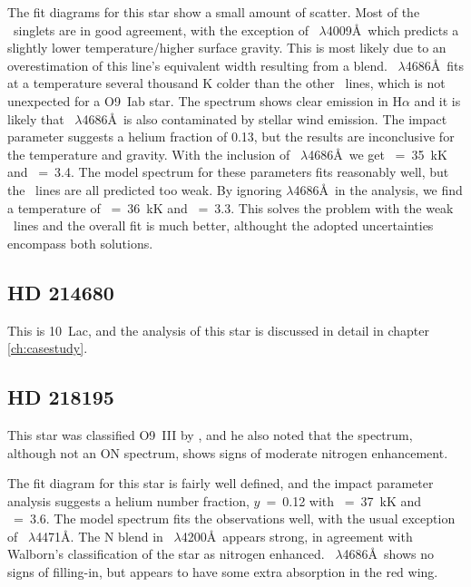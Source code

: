 The fit diagrams for this star show a small amount of scatter. Most of
the \hei\ singlets are in good agreement, with the exception of
\hei~$\lambda$4009\AA\ which predicts a slightly lower
temperature/higher surface gravity. This is most likely due to an
overestimation of this line's equivalent width resulting from a
blend. \heii~$\lambda$4686\AA\ fits at a temperature several thousand
K colder than the other \heii\ lines, which is not unexpected for a
O9~Iab star. The spectrum shows clear emission in H$\alpha$ and it is
likely that \heii~$\lambda$4686\AA\ is also contaminated by stellar
wind emission. The impact parameter suggests a helium fraction of
0.13, but the results are inconclusive for the temperature and
gravity. With the inclusion of \heii~$\lambda$4686\AA\ we get
\teff~=~35~kK and
\logg~=~3.4. The model spectrum for these parameters fits reasonably
well, but the \heii\ lines are all predicted too weak. By ignoring
$\lambda$4686\AA\ in the analysis, we find a temperature of
\teff~=~36~kK and \logg~=~3.3. This solves the problem with the weak
\heii\ lines and the overall fit is much better, althought the adopted
uncertainties encompass both solutions. 

\subsection{HD 214680}  %
\label{analysis:hd214680}

This is 10~Lac, and the analysis of this star is discussed in detail
in chapter \ref{ch:casestudy}.

\subsection{HD 218195}  %
\label{analysis:hd218195} 

This star was classified O9~III by , and he also noted
that the spectrum, although not an ON spectrum, shows signs of
moderate nitrogen enhancement.

The fit diagram for this star is fairly well defined, and the impact
parameter analysis suggests a helium number fraction, $y$~=~0.12 with
\teff~=~37~kK and \logg~=~3.6. The model spectrum fits the
observations well, with the usual exception of
\hei~$\lambda$4471\AA. The N blend in \heii~$\lambda$4200\AA\
appears strong, in agreement with Walborn's classification of the star
as nitrogen enhanced. \heii~$\lambda$4686\AA\ shows no signs of
filling-in, but appears to have some extra absorption in the red wing.

